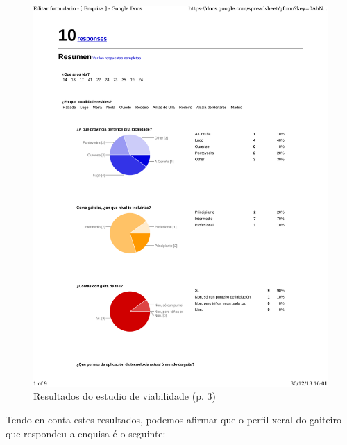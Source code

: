 \begin{figure}[htbp]
 \centering
 \includegraphics[trim=0 22cm 0 0,clip=true,scale=0.7,page=3,keepaspectratio=true]{./imagenes/enquisa.pdf}
 \caption{Resultados do estudio de viabilidade (p. 3)}
 \label{figura:ResultadosEstudioViabilidade3}
\end{figure}

Tendo en conta estes resultados, podemos afirmar que o perfil xeral do gaiteiro
que respondeu a enquisa é o seguinte:

